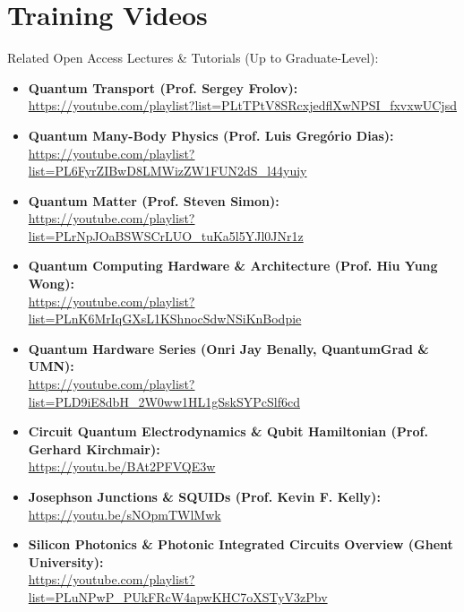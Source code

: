 \chapter{\LARGE{Training Videos}}

\begin{flushleft}
\large Related Open Access Lectures \& Tutorials (Up to Graduate-Level):
\end{flushleft}

\normalsize\begin{itemize}

  \item\textbf{Quantum Transport (Prof. Sergey Frolov):}\\
\url{https://youtube.com/playlist?list=PLtTPtV8SRcxjedflXwNPSI_fxvxwUCjsd}

  \item\textbf{Quantum Many-Body Physics (Prof. Luis Gregório Dias):}\\
\url{https://youtube.com/playlist?list=PL6FyrZIBwD8LMWizZW1FUN2dS_l44yuiy}

  \item\textbf{Quantum Matter (Prof. Steven Simon):}\\
\url{https://youtube.com/playlist?list=PLrNpJOaBSWSCrLUO_tuKa5l5YJl0JNr1z}

  \item\textbf{Quantum Computing Hardware \& Architecture (Prof. Hiu Yung Wong):}\\
\url{https://youtube.com/playlist?list=PLnK6MrIqGXsL1KShnocSdwNSiKnBodpie}

  \item\textbf{Quantum Hardware Series (Onri Jay Benally, QuantumGrad \& UMN):}\\
\url{https://youtube.com/playlist?list=PLD9iE8dbH_2W0ww1HL1gSskSYPcSlf6cd}

  \item\textbf{Circuit Quantum Electrodynamics \& Qubit Hamiltonian (Prof. Gerhard Kirchmair):}\\
\url{https://youtu.be/BAt2PFVQE3w}

  \item\textbf{Josephson Junctions \& SQUIDs (Prof. Kevin F. Kelly):}\\
\url{https://youtu.be/sNOpmTWlMwk}

  \item\textbf{Silicon Photonics \& Photonic Integrated Circuits Overview (Ghent University):}\\
\url{https://youtube.com/playlist?list=PLuNPwP_PUkFRcW4apwKHC7oXSTyV3zPbv}


\end{itemize}
